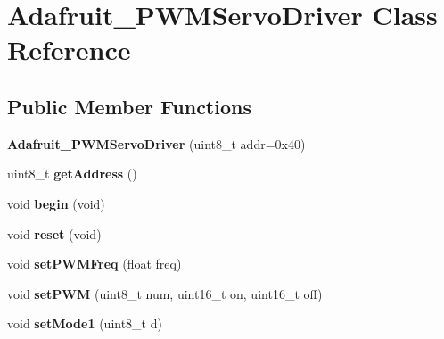 \hypertarget{class_adafruit___p_w_m_servo_driver}{\section{Adafruit\+\_\+\+P\+W\+M\+Servo\+Driver Class Reference}
\label{class_adafruit___p_w_m_servo_driver}
}
\subsection*{Public Member Functions}
\begin{DoxyCompactItemize}
\item 
\hypertarget{class_adafruit___p_w_m_servo_driver_ac6867a236a7dd1f5c0cfbe2485be5b59}{{\bfseries Adafruit\+\_\+\+P\+W\+M\+Servo\+Driver} (uint8\+\_\+t addr=0x40)}\label{class_adafruit___p_w_m_servo_driver_ac6867a236a7dd1f5c0cfbe2485be5b59}

\item 
\hypertarget{class_adafruit___p_w_m_servo_driver_a62218dc26252344482e76cbbb3d34a92}{uint8\+\_\+t {\bfseries get\+Address} ()}\label{class_adafruit___p_w_m_servo_driver_a62218dc26252344482e76cbbb3d34a92}

\item 
\hypertarget{class_adafruit___p_w_m_servo_driver_aef401eaad3c34222ac916eb7bd936bc2}{void {\bfseries begin} (void)}\label{class_adafruit___p_w_m_servo_driver_aef401eaad3c34222ac916eb7bd936bc2}

\item 
\hypertarget{class_adafruit___p_w_m_servo_driver_ac976f52233a75a4bd0eb6f2ce9b82b7f}{void {\bfseries reset} (void)}\label{class_adafruit___p_w_m_servo_driver_ac976f52233a75a4bd0eb6f2ce9b82b7f}

\item 
\hypertarget{class_adafruit___p_w_m_servo_driver_a0ef6f1e3c81aebbd1d1da1bb12f3ed5c}{void {\bfseries set\+P\+W\+M\+Freq} (float freq)}\label{class_adafruit___p_w_m_servo_driver_a0ef6f1e3c81aebbd1d1da1bb12f3ed5c}

\item 
\hypertarget{class_adafruit___p_w_m_servo_driver_a724a7fc39c6fba34478ecc0eea038bd3}{void {\bfseries set\+P\+W\+M} (uint8\+\_\+t num, uint16\+\_\+t on, uint16\+\_\+t off)}\label{class_adafruit___p_w_m_servo_driver_a724a7fc39c6fba34478ecc0eea038bd3}

\item 
\hypertarget{class_adafruit___p_w_m_servo_driver_a4907b0c55826af8eb1482c9f8a7bbf5b}{void {\bfseries set\+Mode1} (uint8\+\_\+t d)}\label{class_adafruit___p_w_m_servo_driver_a4907b0c55826af8eb1482c9f8a7bbf5b}


\end{DoxyCompactItemize}
